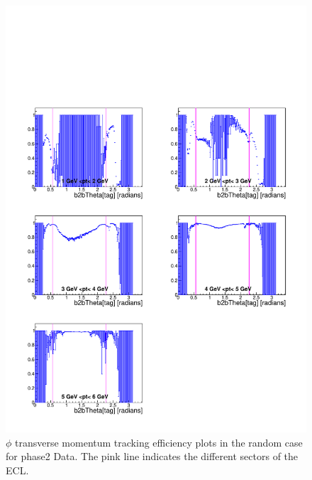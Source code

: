 \documentclass[a4paper,11pt,twosided,final,german,openbib,pdftex,listof=totoc,bibliography=totoc]{scrbook}
\begin{document}
\begin{appendix}
\begin{figure}[!htbp]
	\centering
	\includegraphics[width=\textwidth]{Plots/master/xPtMThetaRandom_Data}
	\caption[Transverse Momentum $\theta$ Random Efficiency Phase2 Data]{$\phi$ transverse momentum tracking efficiency plots in the random case for phase2 Data. The pink line indicates the different sectors of the ECL.}
	\label{plt:PtMThetaRandom_Data}
\end{figure}



\end{appendix}
\end{document}
